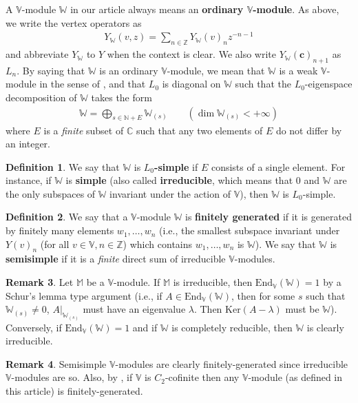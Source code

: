 \documentclass[11pt,b5paper,notitlepage]{article}
\theoremstyle{definition}
\newtheorem{df}{Definition}[section]
\newtheorem{rem}[df]{Remark}
\theoremstyle{plain}
\newcommand{\End}{\mathrm{End}} %
\newcommand{\Vbb}{\mathbb V}
\newcommand{\Wbb}{\mathbb W}
\newcommand{\Mbb}{\mathbb M}
\newcommand{\Cbb}{\mathbb C}
\newcommand{\Nbb}{\mathbb N}
\newcommand{\Zbb}{\mathbb Z}
\newcommand{\cbf}{\mathbf c}
\newcommand{\Ker}{\mathrm{Ker}}
\numberwithin{equation}{section}
\begin{document}
A $\Vbb$-module $\Wbb$ in our article always means an \textbf{ordinary $\Vbb$-module}. As above, we write the vertex operators as
\begin{align*}
Y_\Wbb(v,z)=\sum_{n\in\Zbb}Y_\Wbb(v)_n z^{-n-1}
\end{align*} 
and abbreviate $Y_\Wbb$ to $Y$ when the context is clear. We also write $Y_\Wbb(\cbf)_{n+1}$ as $L_n$. By saying that $\Wbb$ is an ordinary $\Vbb$-module, we mean that $\Wbb$ is a weak $\Vbb$-module in the sense of \cite[Sec. 2]{DLM97}, and that $L_0$ is diagonal on $\Wbb$ such that the $L_0$-eigenspace decomposition of $\Wbb$ takes the form \index{Wn@$\Wbb_{(s)},\Wbb(n)$}
\begin{align}
\Wbb=\bigoplus_{s\in\Nbb+E}\Wbb_{(s)}\qquad(\dim\Wbb_{(s)}<+\infty) \label{eq1}
\end{align}
where $E$ is a \emph{finite} subset of $\Cbb$ such that any two elements of $E$ do not differ by an integer.
\begin{df}
We say that $\Wbb$ is \textbf{$L_0$-simple} if $E$ consists of a single element. For instance, if $\Wbb$ is \textbf{simple} (also called \textbf{irreducible}, which means that $0$ and $\Wbb$ are the only subspaces of $\Wbb$ invariant under the action of $\Vbb$), then $\Wbb$ is $L_0$-simple.
\end{df}

\begin{df}
We say that a $\Vbb$-module $\Wbb$ is \textbf{finitely generated} if it is generated by finitely many elements $w_1,\dots,w_n$ (i.e., the smallest subspace invariant under $Y(v)_n$ (for all $v\in\Vbb,n\in\Zbb$) which contains $w_1,\dots,w_n$ is $\Wbb$). We say that $\Wbb$ is \textbf{semisimple} if it is a \emph{finite} direct sum of irreducible $\Vbb$-modules. 
\end{df}

\begin{rem}\label{lb83}
Let $\Mbb$ be a $\Vbb$-module. If $\Mbb$ is irreducible, then $\End_\Vbb(\Wbb)=1$ by a Schur's lemma type argument (i.e., if $A\in\End_\Vbb(\Wbb)$, then for some $s$ such that $\Wbb_{(s)}\neq 0$, $A|_{\Wbb_{(s)}}$ must have an eigenvalue $\lambda$. Then $\Ker(A-\lambda)$ must be $\Wbb$). Conversely, if $\End_\Vbb(\Wbb)=1$ and if $\Wbb$ is completely reducible, then  $\Wbb$ is clearly irreducible.
\end{rem}



\begin{rem}\label{lb10}
Semisimple $\Vbb$-modules are clearly finitely-generated since irreducible $\Vbb$-modules are so. Also, by \cite[Cor 3.16]{Hua09}, if $\Vbb$ is $C_2$-cofinite then any $\Vbb$-module (as defined in this article) is finitely-generated.
\end{rem}
\end{document}
